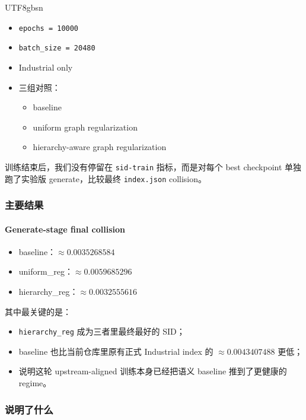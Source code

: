\documentclass[11pt]{article}
\begin{document}
\begin{CJK*}{UTF8}{gbsn}
\begin{itemize}
  \item \texttt{epochs = 10000}
  \item \texttt{batch\_size = 20480}
  \item Industrial only
  \item 三组对照：
  \begin{itemize}
    \item baseline
    \item uniform graph regularization
    \item hierarchy-aware graph regularization
  \end{itemize}
\end{itemize}

训练结束后，我们没有停留在 \texttt{sid-train} 指标，而是对每个 best checkpoint 单独跑了实验版 generate，比较最终 \texttt{index.json} collision。

\subsubsection*{主要结果}

\paragraph{Generate-stage final collision}

\begin{itemize}
  \item baseline：\(\approx 0.0035268584\)
  \item uniform\_reg：\(\approx 0.0059685296\)
  \item hierarchy\_reg：\(\approx 0.0032555616\)
\end{itemize}

其中最关键的是：

\begin{itemize}
  \item \texttt{hierarchy\_reg} 成为三者里最终最好的 SID；
  \item baseline 也比当前仓库里原有正式 Industrial index 的 \(\approx 0.0043407488\) 更低；
  \item 说明这轮 upstream-aligned 训练本身已经把语义 baseline 推到了更健康的 regime。
\end{itemize}

\subsubsection*{说明了什么}


\end{CJK*}
\end{document}

